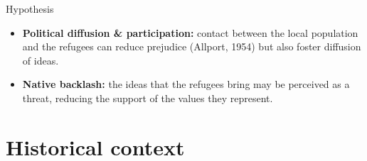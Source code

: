 \documentclass[10pt]{beamer}
\begin{document}
\begin{frame}[label=Hypothesis]{Hypothesis}



\begin{itemize}
    \item \textbf{Political diffusion \& participation:} contact between the local population and the refugees can reduce prejudice (Allport, 1954) but also foster diffusion of ideas. \hyperlink{Presse2}{}
    \vspace{0.4cm}
    \item \textbf{Native backlash:} the ideas that the refugees bring may be perceived as a threat, reducing the support of the values they represent. \hyperlink{Presse1}{}
\end{itemize}

\end{frame}




\section{Historical context}
\end{document}
